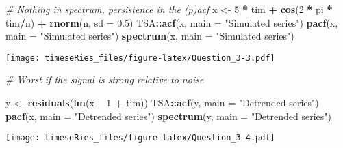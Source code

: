 \documentclass[]{book}
\newenvironment{Shaded}{\begin{snugshade}}{\end{snugshade}}
\newcommand{\CommentTok}[1]{\textcolor[rgb]{0.56,0.35,0.01}{\textit{#1}}}
\newcommand{\DataTypeTok}[1]{\textcolor[rgb]{0.13,0.29,0.53}{#1}}
\newcommand{\DecValTok}[1]{\textcolor[rgb]{0.00,0.00,0.81}{#1}}
\newcommand{\FloatTok}[1]{\textcolor[rgb]{0.00,0.00,0.81}{#1}}
\newcommand{\KeywordTok}[1]{\textcolor[rgb]{0.13,0.29,0.53}{\textbf{#1}}}
\newcommand{\NormalTok}[1]{#1}
\newcommand{\OperatorTok}[1]{\textcolor[rgb]{0.81,0.36,0.00}{\textbf{#1}}}
\newcommand{\StringTok}[1]{\textcolor[rgb]{0.31,0.60,0.02}{#1}}
\begin{document}
\begin{Shaded}
\begin{Highlighting}[]
\CommentTok{# Nothing in spectrum, persistence in the (p)acf}
\NormalTok{x <-}\StringTok{ }\DecValTok{5} \OperatorTok{*}\StringTok{ }\NormalTok{tim }\OperatorTok{+}\StringTok{ }\KeywordTok{cos}\NormalTok{(}\DecValTok{2} \OperatorTok{*}\StringTok{ }\NormalTok{pi }\OperatorTok{*}\StringTok{ }\NormalTok{tim}\OperatorTok{/}\NormalTok{n) }\OperatorTok{+}\StringTok{ }\KeywordTok{rnorm}\NormalTok{(n, }\DataTypeTok{sd =} \FloatTok{0.5}\NormalTok{)}
\NormalTok{TSA}\OperatorTok{::}\KeywordTok{acf}\NormalTok{(x, }\DataTypeTok{main =} \StringTok{"Simulated series"}\NormalTok{)}
\KeywordTok{pacf}\NormalTok{(x, }\DataTypeTok{main =} \StringTok{"Simulated series"}\NormalTok{)}
\KeywordTok{spectrum}\NormalTok{(x, }\DataTypeTok{main =} \StringTok{"Simulated series"}\NormalTok{)}
\end{Highlighting}
\end{Shaded}

\texttt{[image: timeseRies\_files/figure-latex/Question\_3-3.pdf]}

\begin{Shaded}
\begin{Highlighting}[]
\CommentTok{# Worst if the signal is strong relative to noise}

\NormalTok{y <-}\StringTok{ }\KeywordTok{residuals}\NormalTok{(}\KeywordTok{lm}\NormalTok{(x }\OperatorTok{~}\StringTok{ }\DecValTok{1} \OperatorTok{+}\StringTok{ }\NormalTok{tim))}
\NormalTok{TSA}\OperatorTok{::}\KeywordTok{acf}\NormalTok{(y, }\DataTypeTok{main =} \StringTok{"Detrended series"}\NormalTok{)}
\KeywordTok{pacf}\NormalTok{(x, }\DataTypeTok{main =} \StringTok{"Detrended series"}\NormalTok{)}
\KeywordTok{spectrum}\NormalTok{(y, }\DataTypeTok{main =} \StringTok{"Detrended series"}\NormalTok{)}
\end{Highlighting}
\end{Shaded}

\texttt{[image: timeseRies\_files/figure-latex/Question\_3-4.pdf]}
\end{document}

